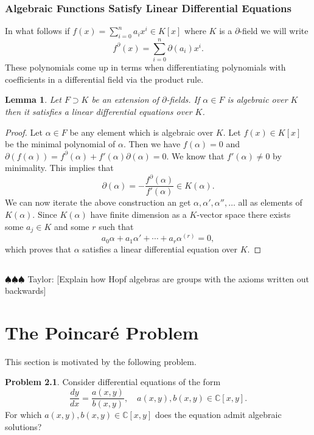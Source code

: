 \documentclass[12pt]{book}
\newcommand{\taylor}[1]{{\color{blue} \sf $\spadesuit\spadesuit\spadesuit$ Taylor: [#1]}}
\numberwithin{equation}{section}
\newtheorem{lemma}[theorem]{Lemma}
\theoremstyle{definition}
\newtheorem{problem}[theorem]{Problem}
\theoremstyle{remark}
\newcommand{\CC}{\mathbb{C}}
\begin{document}
\subsection{Algebraic Functions Satisfy Linear Differential Equations}
In what follows if $f(x) = \sum_{i=0}^n a_i x^i \in K[x]$ where $K$ is a $\partial$-field we will write 
$$ f^{\partial}(x) = \sum_{i=0}^n \partial(a_i) x^i.$$
These polynomials come up in terms when differentiating polynomials with coefficients in a differential field via the product rule. 
\begin{lemma}
	Let $F \supset K$ be an extension of $\partial$-fields.
	If $\alpha \in F$ is algebraic over $K$ then it satisfies a linear differential equations over $K$.
\end{lemma}
\begin{proof}
	Let $\alpha \in F$ be any element which is algebraic over $K$. 
	Let $f(x) \in K[x]$ be the minimal polynomial of $\alpha$. 
	Then we have $f(\alpha)=0$ and $\partial(f(\alpha)) = f^{\partial}(\alpha) + f'(\alpha) \partial(\alpha) =0$. 
	We know that $f'(\alpha)\neq 0$ by minimality. 
	This implies that 
	$$\partial(\alpha) = -\frac{f^{\partial}(\alpha)}{f'(\alpha)} \in K(\alpha).$$
	We can now iterate the above construction an get $\alpha, \alpha', \alpha'', \ldots$ all as elements of $K(\alpha)$. 
	Since $K(\alpha)$ have finite dimension as a $K$-vector space there exists some $a_j \in K$ and some $r$ such that 
	$$ a_0 \alpha + a_1 \alpha' + \cdots + a_r \alpha^{(r)} =0,$$
	which proves that $\alpha$ satisfies a linear differential equation over $K$.
\end{proof}

\section{}
\taylor{Explain how Hopf algebras are groups with the axioms written out backwards}


\chapter[Poincar\'e Problem]{The Poincar\'e Problem}

This section is motivated by the following problem.
\begin{problem}
	Consider differential equations of the form
	 $$ \dfrac{dy}{dx} = \frac{a(x,y)}{b(x,y)}, \quad a(x,y),b(x,y) \in \CC[x,y].$$
	 For which $a(x,y),b(x,y) \in \CC[x,y]$ does the equation admit algebraic solutions?
\end{problem}
\end{document}
